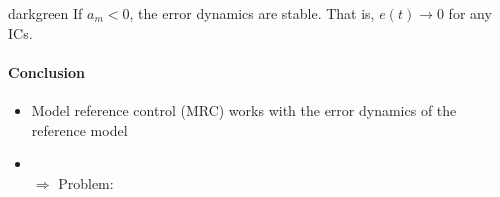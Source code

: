 \begin{conclusion}{darkgreen}
If $a_m <0$, the error dynamics are stable.
That is, $e(t) \rightarrow 0$ for any ICs.
\end{conclusion}

\paragraph{Conclusion}
\begin{itemize}
\item Model reference control (MRC) works with the error dynamics of the
    reference model
\item {} \\
    $\Rightarrow$ Problem: 
\end{itemize}
